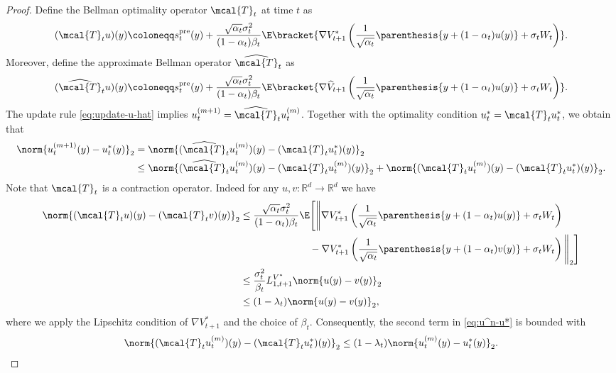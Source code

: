 \documentclass{article}
\begin{document}
\begin{proof}
Define the Bellman optimality operator $\mcal{T}_t$ at time $t$ as
\begin{align*}
    (\mcal{T}_t u )(y) \coloneqq s_{t}^{\rm pre}(y) + \frac{\sqrt{\alpha_{t}}\sigma_{t}^{2}}{(1 - \alpha_{t})\beta_t}\E\bracket{\nabla V_{t+1}^{*}\left(\frac{1}{\sqrt{\alpha_t}}\parenthesis{y + (1 - \alpha_t)u(y)} + \sigma_t W_t\right)}.
\end{align*}
Moreover, define the approximate Bellman operator $\widehat{\mcal{T}}_t$ as
\begin{align*}
    (\widehat{\mcal{T}}_t u )(y) \coloneqq s_{t}^{\rm pre}(y) + \frac{\sqrt{\alpha_{t}}\sigma_{t}^{2}}{(1 - \alpha_{t})\beta_t}\E\bracket{\nabla \widehat{V}_{t+1}\left(\frac{1}{\sqrt{\alpha_t}}\parenthesis{y + (1 - \alpha_t)u(y)} + \sigma_t W_t\right)}.
\end{align*}
The update rule \eqref{eq:update-u-hat} implies $ u_{t}^{(m+1)} = \widehat{\mcal{T}}_t u_{t}^{(m)} $. Together with the optimality condition $u_t^* = \mcal{T}_t u_t^*$, we obtain that
\begin{align}
\norm{u_{t}^{(m+1)}(y) - u_{t}^{*}(y)}_{2} & = \norm{(\widehat{\mcal{T}}_t u_{t}^{(m)})(y) - (\mcal{T}_{t}u_{t}^{*})(y)}_{2} \nonumber \\ & \leq \norm{(\widehat{\mcal{T}}_t u_{t}^{(m)})(y) - (\mcal{T}_{t}u_{t}^{(m)})(y)}_{2} + \norm{(\mcal{T}_t u_{t}^{(m)})(y) - (\mcal{T}_{t}u_{t}^{*})(y)}_{2}.\label{eq:u^n-u*}
\end{align}
Note that $\mcal{T}_t$ is a contraction operator. Indeed for any $u, v:\mathbb{R}^d\rightarrow\mathbb{R}^d$ we have 
\begin{align}
    \norm{(\mcal{T}_t u)(y) - (\mcal{T}_t v)(y)}_2 & \leq  \frac{\sqrt{\alpha_{t}}\sigma_{t}^{2}}{(1 - \alpha_{t})\beta_t} \E\Bigg[ \Bigg\|\nabla V_{t+1}^{*}\left(\frac{1}{\sqrt{\alpha_t}}\parenthesis{y + (1 - \alpha_t)u(y)} + \sigma_t W_t\right) \nonumber \\ & \quad \qquad \qquad \qquad  - \nabla V_{t+1}^{*}\left(\frac{1}{\sqrt{\alpha_t}}\parenthesis{y + (1 - \alpha_t)v(y)} + \sigma_t W_t\right)\Bigg\|_2 \Bigg] \nonumber\\ & \leq \frac{\sigma_t^2}{\beta_t}L_{1, t+1}^{V^*}\norm{u(y) - v(y)}_2 \nonumber \\ & \leq (1 - \lambda_t)\norm{u(y) - v(y)}_2, \label{eq:contraction}
\end{align}
where we apply the Lipschitz condition of $\nabla V^*_{t+1}$ and the choice of $\beta_t$. Consequently, the second term in \eqref{eq:u^n-u*} is bounded with
\begin{align}
    \norm{(\mcal{T}_t u_{t}^{(m)})(y) - (\mcal{T}_{t}u_{t}^{*})(y)}_{2} \leq (1 - \lambda_{t})\norm{u_{t}^{(m)}(y) - u_{t}^{*}(y)}_{2}.\label{eq:Tun}
\end{align}


\end{proof}
\end{document}
